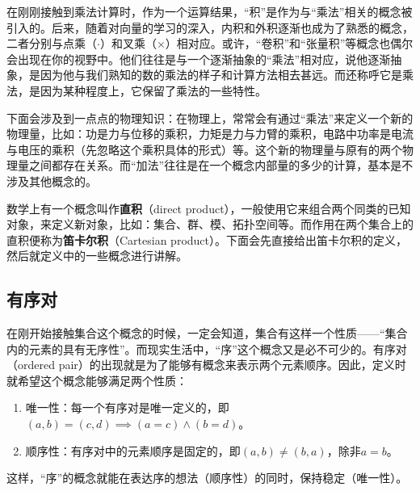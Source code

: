 
\begin{issues}
\issueDraft
\end{issues}

在刚刚接触到乘法计算时，作为一个运算结果，“积”是作为与“乘法”相关的概念被引入的。后来，随着对向量的学习的深入，内积和外积逐渐也成为了熟悉的概念，二者分别与点乘（$\cdot$）和叉乘（$\times$）相对应。或许，“卷积”和“张量积”等概念也偶尔会出现在你的视野中。他们往往是与一个逐渐抽象的“乘法”相对应，说他逐渐抽象，是因为他与我们熟知的数的乘法的样子和计算方法相去甚远。而还称呼它是乘法，是因为某种程度上，它保留了乘法的一些特性。

下面会涉及到一点点的物理知识：在物理上，常常会有通过“乘法”来定义一个新的物理量，比如：功是力与位移的乘积，力矩是力与力臂的乘积，电路中功率是电流与电压的乘积（先忽略这个乘积具体的形式）等。这个新的物理量与原有的两个物理量之间都存在关系。而“加法”往往是在一个概念内部量的多少的计算，基本是不涉及其他概念的。

数学上有一个概念叫作\textbf{直积}（direct product），一般使用它来组合两个同类的已知对象，来定义新对象，比如：集合、群、模、拓扑空间等。而作用在两个集合上的直积便称为\textbf{笛卡尔积}（Cartesian product）。下面会先直接给出笛卡尔积的定义，然后就定义中的一些概念进行讲解。



\subsection{有序对}

在刚开始接触集合这个概念的时候，一定会知道，集合有这样一个性质——“集合内的元素的具有无序性”。而现实生活中，“序”这个概念又是必不可少的。有序对（ordered pair）的出现就是为了能够有概念来表示两个元素顺序。因此，定义时就希望这个概念能够满足两个性质：

\begin{enumerate}
\item 唯一性：每一个有序对是唯一定义的，即$(a, b) = (c, d)\implies (a = c) \land (b = d)$。
\item 顺序性：有序对中的元素顺序是固定的，即$(a, b)\neq (b, a)$，除非$a = b$。
\end{enumerate}

这样，“序”的概念就能在表达序的想法（顺序性）的同时，保持稳定（唯一性）。

